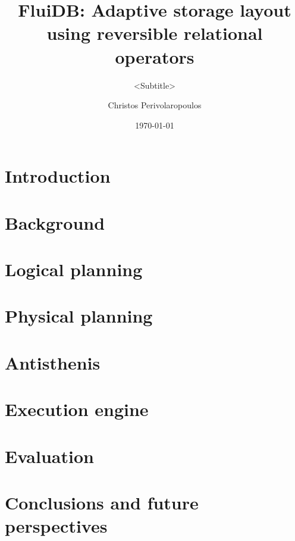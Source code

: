 \documentclass{beamer}
\title{FluiDB: Adaptive storage layout using reversible relational operators}
\subtitle{<Subtitle>}
\author{Christos Perivolaropoulos}
\institute{University of Edinburgh}
\date{\today}
\begin{document}
\begin{frame}
\titlepage
\end{frame}

\section{Introduction}
\label{section:introduction}


\section{Background}
\label{section:background}


\section{Logical planning}
\label{section:fluidb_logical_planning}


\section{Physical planning}
\label{section:physical_planning}


\section{Antisthenis}
\label{section:antisthenis}


\section{Execution engine}
\label{section:execution_engine}


\section{Evaluation}
\label{section:evaluation}


\section{Conclusions and future perspectives}
\label{section:conclusion}

\end{document}
